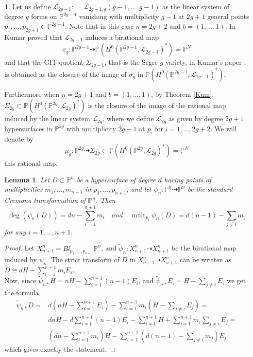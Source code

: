 \documentclass[a4paper,10pt]{amsart}
\newtheorem{Lemma}[thm]{Lemma}
\theoremstyle{definition}
\newtheorem{say}[thm]{}
\DeclareMathOperator{\mult}{mult}
\begin{document}
\begin{say}
Let us define $\mathcal{L}_{2g-1}: = \mathcal{L}_{2g-1,g}(g-1,\dots,g-1)$ as the linear system of degree $g$ forms on $\mathbb{P}^{2g-1}$ vanishing with multiplicity $g-1$ at $2g+1$ general points $p_{1},\dots,p_{2g+1}\in\mathbb{P}^{2g-1}$. Note that in this case $n = 2g+2$ and $b = (1,\dots,1)$. In \cite[Theorem 4.1]{Ku00} Kumar proved that $\mathcal{L}_{2g-1}$ induces a birational map
\begin{equation}\label{mapseg}
\sigma_g:\mathbb{P}^{2g-1}\dasharrow\mathbb{P}(H^0(\mathbb{P}^{2g-1},\mathcal{L}_{2g-1})^{*}) = \mathbb{P}^N
\end{equation}
and that the GIT quotient $\Sigma_{2g-1}$, that is the Segre $g$-variety, in Kumar's paper \cite{Ku00}, is obtained as the closure of the image of $\sigma_g$ in $\mathbb{P}(H^0(\mathbb{P}^{2g-1},\mathcal{L}_{2g-1})^{*})$.

Furthermore when $n = 2g+1$ and $b = (1,\dots,1)$, by Theorem \ref{Kum}, $\Sigma_{2g}\subset \mathbb{P}(H^0(\mathbb{P}^{2g},\mathcal{L}_{2g})^*)$ 
is the closure of the image of the rational map induced by the linear 
system $\mathcal{L}_{2g}$, where we define $\mathcal{L}_{2g}$ as given by degree $2g+1$ hypersurfaces in $\mathbb{P}^{2g}$ with multiplicity $2g-1$ at $p_i$ for $i = 1,\dots,2g+2$. We will denote by 
\begin{equation}\label{mapeven}
\mu_g:\mathbb{P}^{2g}\dasharrow \Sigma_{2g}\subset \mathbb{P}(H^0(\mathbb{P}^{2g},\mathcal{L}_{2g})^{*}) = \mathbb{P}^N
\end{equation}
this rational map. 
\end{say}

\begin{Lemma}\label{founCrem}
Let $D\subset\mathbb{P}^n$ be a hypersurface of degree $d$ having points of multiplicities $m_1,\dots,m_{n+1}$ in $p_1,\dots,p_{n+1}$, and let $\psi_n:\mathbb{P}^{n}\dasharrow\mathbb{P}^n$ be the standard Cremona transformation of $\mathbb{P}^n$. Then 
$$\deg(\psi_n(D)) = dn-\sum_{i=1}^{n+1}m_i \quad and \quad \mult_{p_i}\psi_n(D) = d(n-1)-\sum_{j\neq i}m_j$$
for any $i = 1,\dots,n+1$.
\end{Lemma}
\begin{proof}
Let $X_{n+1}^n = Bl_{p_1,\dots,p_{n+1}}\mathbb{P}^n$, and $\widetilde{\psi}_n:X_{n+1}^n\dasharrow X_{n+1}^n$ be the birational map induced by $\psi_n$. The strict transform of $D$ in $X_{n+1}^n\dasharrow X_{n+1}^n$ can be written as $\widetilde{D} \cong dH-\sum_{i=1}^{n+1}m_iE_i$.\\
Now, since $\widetilde{\psi}_{n*}H = nH-\sum_{i=1}^{n+1}(n-1)E_i$, and $\widetilde{\psi}_{n*}E_i = H-\sum_{j\neq i}E_i$ we get the formula
$$
\begin{array}{ll}
\widetilde{\psi}_{n*}D = & d(nH-\sum_{i=1}^{n+1}E_i)-\sum_{i=1}^{n+1}m_i(H-\sum_{j\neq i}E_j)=\\
 & dnH-d\sum_{i=1}^{n+1}(n-1)E_i-\sum_{i=1}^{n+1}H+\sum_{i=1}^{n+1}m_i\sum_{j\neq i}E_j =\\ 
 & (dn-\sum_{i=1}^{n+1}m_i)H-\sum_{i=1}^{n+1}(d(n-1)-\sum_{j\neq i}m_j)E_j
\end{array} 
$$
which gives exactly the statement.
\end{proof}
\end{document}
